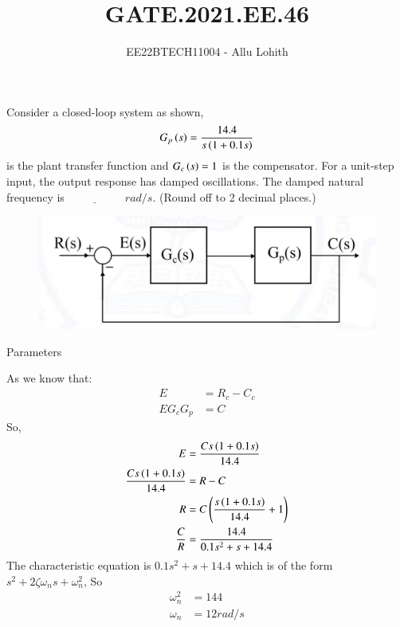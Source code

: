 \documentclass[journal,12pt,twocolumn]{IEEEtran}
\theoremstyle{remark}
\begin{document}

\vspace{3cm}

\title{GATE.2021.EE.46}
\author{EE22BTECH11004 - Allu Lohith}

\maketitle
\newpage
\bigskip

\renewcommand{\thefigure}{\theenumi}
\renewcommand{\thetable}{\theenumi}

Consider a closed-loop system as shown, $$G_p\left(s\right)= \frac{14.4}{s\left(1+0.1s\right)}$$ is the plant transfer function and $G_c\left(s\right)=1$ is the compensator. For a unit-step input, the output response has damped oscillations. The damped natural frequency is $\underline{\hspace{2cm}}$
$rad/s$. (Round off to 2 decimal places.)

\begin{figure}[h]
    \centering  
\includegraphics[width=\columnwidth]{2021/EE/46/figs/dia.png}
    \label{fig:ee.46.2021}
\end{figure}
\solution 
\fi
\begin{table}[h!]
\centering

\vspace{0.5cm}
\caption{\normalsize Parameters}
\end{table}
As we know that:
\begin{align}
E&=R_c-C_c\\
EG_cG_p&=C
\end{align}
So,
\begin{align}
E &= \frac{Cs\left(1+0.1s\right)}{14.4}\\
\frac{Cs\left(1+0.1s\right)}{14.4} &=R-C\\
R &=C\left(\frac{s\left(1+0.1s\right)}{14.4}+1\right)\\
\frac{C}{R} &= \frac{14.4}{0.1s^2+s+14.4}
\end{align}
The characteristic equation is $0.1s^2+s+14.4$ which is of the form $s^2 + 2\zeta\omega_n s + \omega_n^2$, So 
\begin{align}
    \omega_n^2&=144\\
    \omega_n&= 12rad/s
\end{align}
\end{document}

